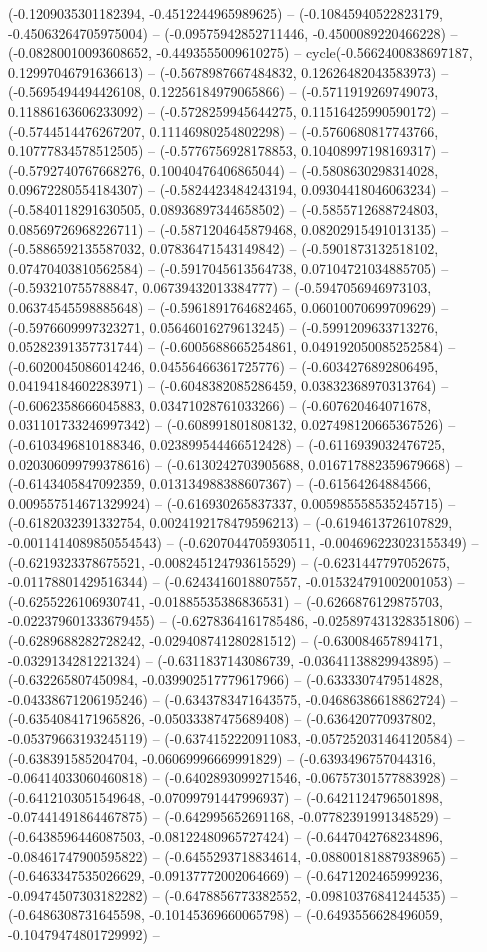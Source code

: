 (-0.1209035301182394, -0.4512244965989625) -- (-0.10845940522823179, -0.45063264705975004) -- (-0.09575942852711446, -0.4500089220466228) -- (-0.08280010093608652, -0.4493555009610275) -- cycle(-0.5662400838697187, 0.12997046791636613) -- (-0.5678987667484832, 0.12626482043583973) -- (-0.5695494494426108, 0.12256184979065866) -- (-0.5711919269749073, 0.11886163606233092) -- (-0.5728259945644275, 0.11516425990590172) -- (-0.5744514476267207, 0.11146980254802298) -- (-0.5760680817743766, 0.10777834578512505) -- (-0.5776756928178853, 0.10408997198169317) -- (-0.5792740767668276, 0.10040476406865044) -- (-0.5808630298314028, 0.09672280554184307) -- (-0.5824423484243194, 0.09304418046063234) -- (-0.5840118291630505, 0.08936897344658502) -- (-0.5855712688724803, 0.08569726968226711) -- (-0.5871204645879468, 0.08202915491013135) -- (-0.5886592135587032, 0.07836471543149842) -- (-0.5901873132518102, 0.07470403810562584) -- (-0.5917045613564738, 0.07104721034885705) -- (-0.593210755788847, 0.06739432013384777) -- (-0.5947056946973103, 0.06374545598885648) -- (-0.5961891764682465, 0.06010070699709629) -- (-0.5976609997323271, 0.05646016279613245) -- (-0.5991209633713276, 0.05282391357731744) -- (-0.6005688665254861, 0.049192050085252584) -- (-0.6020045086014246, 0.04556466361725776) -- (-0.6034276892806495, 0.04194184602283971) -- (-0.6048382085286459, 0.03832368970313764) -- (-0.6062358666045883, 0.03471028761033266) -- (-0.607620464071678, 0.031101733246997342) -- (-0.608991801808132, 0.027498120665367526) -- (-0.6103496810188346, 0.023899544466512428) -- (-0.6116939032476725, 0.020306099799378616) -- (-0.6130242703905688, 0.016717882359679668) -- (-0.6143405847092359, 0.013134988388607367) -- (-0.61564264884566, 0.009557514671329924) -- (-0.616930265837337, 0.005985558535245715) -- (-0.6182032391332754, 0.0024192178479596213) -- (-0.6194613726107829, -0.0011414089850554543) -- (-0.6207044705930511, -0.004696223023155349) -- (-0.6219323378675521, -0.008245124793615529) -- (-0.6231447797052675, -0.01178801429516344) -- (-0.6243416018807557, -0.015324791002001053) -- (-0.6255226106930741, -0.01885535386836531) -- (-0.6266876129875703, -0.022379601333679455) -- (-0.6278364161785486, -0.025897431328351806) -- (-0.6289688282728242, -0.029408741280281512) -- (-0.630084657894171, -0.0329134281221324) -- (-0.6311837143086739, -0.03641138829943895) -- (-0.632265807450984, -0.039902517779617966) -- (-0.6333307479514828, -0.04338671206195246) -- (-0.6343783471643575, -0.04686386618862724) -- (-0.6354084171965826, -0.05033387475689408) -- (-0.636420770937802, -0.05379663193245119) -- (-0.6374152220911083, -0.057252031464120584) -- (-0.638391585204704, -0.06069996669991829) -- (-0.6393496757044316, -0.06414033060460818) -- (-0.6402893099271546, -0.06757301577883928) -- (-0.6412103051549648, -0.07099791447996937) -- (-0.6421124796501898, -0.07441491864467875) -- (-0.642995652691168, -0.07782391991348529) -- (-0.6438596446087503, -0.08122480965727424) -- (-0.6447042768234896, -0.08461747900595822) -- (-0.6455293718834614, -0.08800181887938965) -- (-0.6463347535026629, -0.09137772002064669) -- (-0.6471202465999236, -0.09474507303182282) -- (-0.6478856773382552, -0.09810376841244535) -- (-0.6486308731645598, -0.10145369660065798) -- (-0.6493556628496059, -0.10479474801729992) -- 